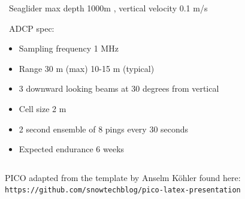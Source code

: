 \documentclass[unknownkeysallowed,usepdftitle=false]{beamer}
\newcommand{\secvariable}{nothing}
\newcommand{\mysection}[1]{\renewcommand{\secvariable}{#1}
}
\begin{document}


\mysection{tech}
\begin{frame}\label{\secvariable}

  \vspace{-1.5cm}
\ Seaglider max depth 1000m , vertical velocity 0.1 m/s

\ ADCP spec:
\begin{itemize}
\item Sampling frequency 1 MHz 
\item Range 30 m (max) 10-15 m (typical)
\item 3 downward looking beams at 30 degrees from vertical 
\item Cell size 2 m
\item 2 second ensemble of 8 pings every 30 seconds
\item Expected endurance 6 weeks
\end{itemize}
  
\begin{columns}
\begin{column}[t]{0.9\textwidth}
PICO adapted from the template by Anselm K\"ohler found here: \\ \texttt{https://github.com/snowtechblog/pico-latex-presentation}
\end{column}
\end{columns}
\end{frame}
\end{document}
